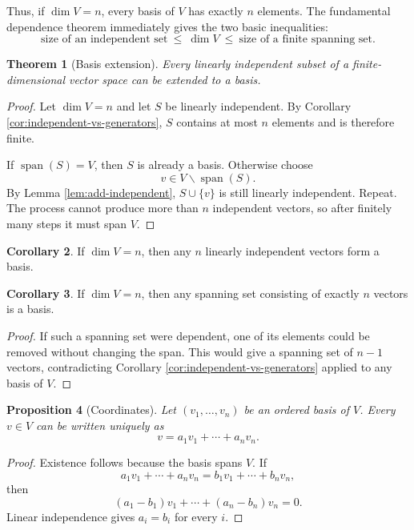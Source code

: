 \documentclass{amsbook}
\newtheorem{theorem}{Theorem}[chapter]
\newtheorem{proposition}[theorem]{Proposition}
\theoremstyle{definition}
\newtheorem{corollary}[theorem]{Corollary}
\theoremstyle{remark}
\numberwithin{section}{chapter}
\numberwithin{equation}{chapter}
\begin{document}
Thus, if $\dim V=n$, every basis of $V$ has exactly $n$ elements. The fundamental dependence theorem immediately gives the two basic inequalities:
\[
\boxed{
\text{size of an independent set}
\ \le\ \dim V
\ \le\
\text{size of a finite spanning set}.
}
\]

\begin{theorem}[Basis extension]\label{thm:basis-extension}
	Every linearly independent subset of a finite-dimensional vector space can be extended to a basis.
\end{theorem}

\begin{proof}
	Let $\dim V=n$ and let $S$ be linearly independent. By Corollary \ref{cor:independent-vs-generators}, $S$ contains at most $n$ elements and is therefore finite.

	If $\operatorname{span}(S)=V$, then $S$ is already a basis. Otherwise choose
	\[
	v\in V\backslash\operatorname{span}(S).
	\]
	By Lemma \ref{lem:add-independent}, $S\cup\{v\}$ is still linearly independent. Repeat. The process cannot produce more than $n$ independent vectors, so after finitely many steps it must span $V$.
\end{proof}

\begin{corollary}\label{cor:n-independent-basis}
	If $\dim V=n$, then any $n$ linearly independent vectors form a basis.
\end{corollary}

\begin{corollary}\label{cor:n-spanning-basis}
	If $\dim V=n$, then any spanning set consisting of exactly $n$ vectors is a basis.
\end{corollary}

\begin{proof}
	If such a spanning set were dependent, one of its elements could be removed without changing the span. This would give a spanning set of $n-1$ vectors, contradicting Corollary \ref{cor:independent-vs-generators} applied to any basis of $V$.
\end{proof}

\begin{proposition}[Coordinates]\label{prop:coordinates}
	Let $(v_1,\dots,v_n)$ be an ordered basis of $V$. Every $v\in V$ can be written uniquely as
	\[
	v=a_1v_1+\cdots+a_nv_n.
	\]
\end{proposition}

\begin{proof}
	Existence follows because the basis spans $V$. If
	\[
	a_1v_1+\cdots+a_nv_n
	=
	b_1v_1+\cdots+b_nv_n,
	\]
	then
	\[
	(a_1-b_1)v_1+\cdots+(a_n-b_n)v_n=0.
	\]
	Linear independence gives $a_i=b_i$ for every $i$.
\end{proof}
\end{document}
